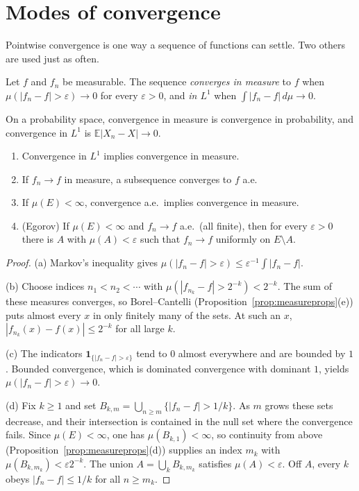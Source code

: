 \section{Modes of convergence}

Pointwise convergence is one way a sequence of functions can settle. Two others are used just as often.

\begin{definition}
Let \(f\) and \(f_n\) be measurable. The sequence \emph{converges in measure} to \(f\) when \(\mu(|f_n-f|>\varepsilon)\to0\) for every \(\varepsilon>0\), and \emph{in \(L^1\)} when \(\int|f_n-f|\,d\mu\to0\).
\end{definition}

On a probability space, convergence in measure is convergence in probability, and convergence in \(L^1\) is \(\mathbb E|X_n-X|\to0\).

\begin{proposition}\label{prop:modes}
\begin{enumerate}[label=(\alph*)]
\item Convergence in \(L^1\) implies convergence in measure.
\item If \(f_n\to f\) in measure, a subsequence converges to \(f\) a.e.
\item If \(\mu(E)<\infty\), convergence a.e.\ implies convergence in measure.
\item (Egorov) If \(\mu(E)<\infty\) and \(f_n\to f\) a.e.\ (all finite), then for every \(\varepsilon>0\) there is \(A\) with \(\mu(A)<\varepsilon\) such that \(f_n\to f\) uniformly on \(E\setminus A\).
\end{enumerate}
\end{proposition}
\begin{proof}
(a) Markov's inequality gives \(\mu(|f_n-f|>\varepsilon)\le\varepsilon^{-1}\int|f_n-f|\).

(b) Choose indices \(n_1<n_2<\cdots\) with \(\mu(|f_{n_k}-f|>2^{-k})<2^{-k}\). The sum of these measures converges, so Borel--Cantelli (Proposition~\ref{prop:measureprops}(e)) puts almost every \(x\) in only finitely many of the sets. At such an \(x\), \(|f_{n_k}(x)-f(x)|\le2^{-k}\) for all large \(k\).

(c) The indicators \(\mathbf 1_{\{|f_n-f|>\varepsilon\}}\) tend to \(0\) almost everywhere and are bounded by \(1\). Bounded convergence, which is dominated convergence with dominant \(1\), yields \(\mu(|f_n-f|>\varepsilon)\to0\).

(d) Fix \(k\ge1\) and set \(B_{k,m}=\bigcup_{n\ge m}\{|f_n-f|>1/k\}\). As \(m\) grows these sets decrease, and their intersection is contained in the null set where the convergence fails. Since \(\mu(E)<\infty\), one has \(\mu(B_{k,1})<\infty\), so continuity from above (Proposition~\ref{prop:measureprops}(d)) supplies an index \(m_k\) with \(\mu(B_{k,m_k})<\varepsilon2^{-k}\). The union \(A=\bigcup_kB_{k,m_k}\) satisfies \(\mu(A)<\varepsilon\). Off \(A\), every \(k\) obeys \(|f_n-f|\le1/k\) for all \(n\ge m_k\).
\end{proof}

